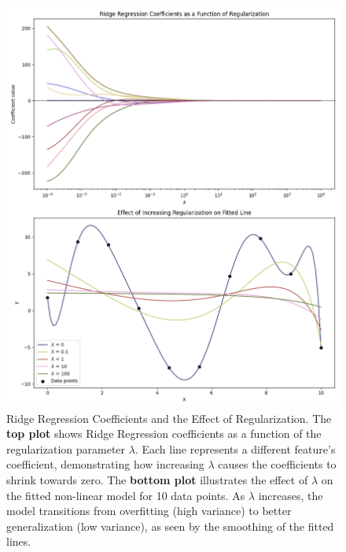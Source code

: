 \documentclass[english,11pt,a4paper,titlepage]{article}
\begin{document}
	\begin{figure}[t]
		\centering
		\includegraphics[width=1.0\linewidth]{img/ridge_lambda_effect}
		\caption{Ridge Regression Coefficients and the Effect of Regularization. The \textbf{top plot} shows Ridge Regression coefficients as a function of the regularization parameter $\lambda$. Each line represents a different feature's coefficient, demonstrating how increasing $\lambda$ causes the coefficients to shrink towards zero. The \textbf{bottom plot} illustrates the effect of $\lambda$ on the fitted non-linear model for 10 data points. As $\lambda$ increases, the model transitions from overfitting (high variance) to better generalization (low variance), as seen by the smoothing of the fitted lines.}
		\label{fig:ridgelambdaeffect}
	\end{figure}
	
	
\end{document}
